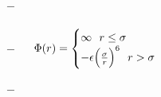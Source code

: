 \begin{mdframed}
    \tab $-$ ~~  \\
    
    \\
    
    \tab $-$ ~~ $\pot(\pos)=\begin{cases}
                    \infty ~~ \pos \leq \molecrad\\
                    -\dielec\Big(\frac{\molecrad}{\pos}\Big)^6 ~~ \pos > \molecrad\\
                \end{cases}$
                
    \tab $-$ ~~  \\
    
\end{mdframed}